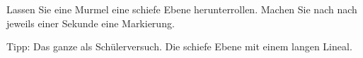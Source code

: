 Lassen Sie eine Murmel eine schiefe Ebene herunterrollen.
Machen Sie nach nach jeweils einer Sekunde eine Markierung.

Tipp: Das ganze als Schülerversuch. Die schiefe Ebene mit einem langen Lineal.
